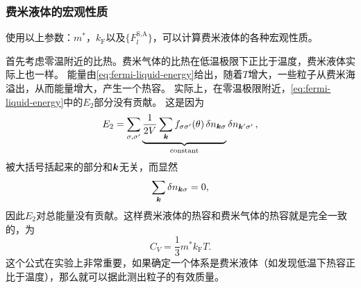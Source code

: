 \documentclass[hyperref, UTF8, a4paper]{ctexart}
\begin{document}
\subsubsection{费米液体的宏观性质}

使用以上参数：$m^*$，$k_\text{F}$以及$\{F_l^\text{S,A}\}$，可以计算费米液体的各种宏观性质。

首先考虑零温附近的比热。费米气体的比热在低温极限下正比于温度，费米液体实际上也一样。
能量由\eqref{eq:fermi-liquid-energy}给出，随着$T$增大，一些粒子从费米海溢出，从而能量增大，产生一个热容。
实际上，在零温极限附近，\eqref{eq:fermi-liquid-energy}中的$E_2$部分没有贡献。
这是因为
\[
    E_2 = \sum_{\sigma, \sigma'} \underbrace{\frac{1}{2V} \sum_{\vb*{k}} f_{\sigma \sigma'}(\theta) \var{n}_{\vb*{k} \sigma}}_{\text{constant}} \var{n}_{\vb*{k}' \sigma'},
\]
被大括号括起来的部分和$\vb*{k}$无关，而显然
\[
    \sum_{\vb*{k}} \var{n}_{\vb*{k} \sigma} = 0,
\]
因此$E_2$对总能量没有贡献。这样费米液体的热容和费米气体的热容就是完全一致的，为
\begin{equation}
    C_V = \frac{1}{3} m^* k_\text{F} T.
\end{equation}
这个公式在实验上非常重要，如果确定一个体系是费米液体（如发现低温下热容正比于温度），那么就可以据此测出粒子的有效质量。
\end{document}
